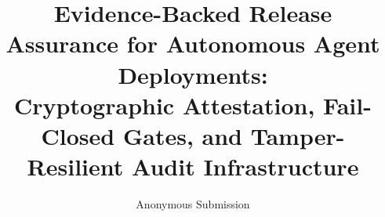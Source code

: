\documentclass[letterpaper,10pt,twocolumn]{article}
\theoremstyle{definition}
\begin{document}
\title{\Large \bf Evidence-Backed Release Assurance for Autonomous Agent Deployments:\\
Cryptographic Attestation, Fail-Closed Gates, and Tamper-Resilient Audit Infrastructure}

%
%
%
%
\newif\ifanonymous
\anonymoustrue          %

\ifanonymous
  \author{{\rm Anonymous Submission}}
\else
  \author{
  {\rm Petar Radanliev}\\
  The Open University\\
  The Alan Turing Institute\\
  \normalsize\nolinkurl{radanliev@gmail.com}
  }
\fi

\maketitle
\end{document}
